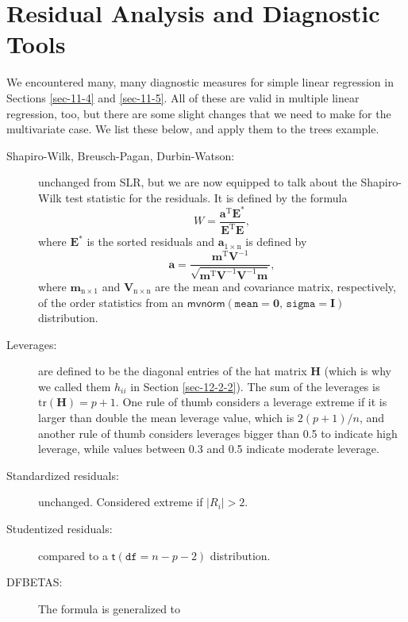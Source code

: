 \section{Residual Analysis and Diagnostic Tools}
\label{sec-12-6}

We encountered many, many diagnostic measures for simple linear
regression in Sections \ref{sec-11-4} and \ref{sec-11-5}. All of these are valid in multiple linear regression, too, but
there are some slight changes that we need to make for the
multivariate case. We list these below, and apply them to the trees
example.

\begin{description}
\item[{Shapiro-Wilk, Breusch-Pagan, Durbin-Watson:}] unchanged from SLR,
but we are now equipped to talk about the Shapiro-Wilk test
statistic for the residuals. It is defined by the formula
\begin{equation}
W=\frac{\mathbf{a}^{\mathrm{T}}\mathbf{E}^{\ast}}{\mathbf{E}^{\mathrm{T}}\mathbf{E}},
\end{equation}
where \(\mathbf{E}^{\ast}\) is the sorted residuals and
\(\mathbf{a}_{1\times\mathrm{n}}\) is defined by
\begin{equation}
\mathbf{a}=\frac{\mathbf{m}^{\mathrm{T}}\mathbf{V}^{-1}}{\sqrt{\mathbf{m}^{\mathrm{T}}\mathbf{V}^{-1}\mathbf{V}^{-1}\mathbf{m}}},
\end{equation}
where \(\mathbf{m}_{\mathrm{n}\times1}\) and
\(\mathbf{V}_{\mathrm{n}\times\mathrm{n}}\) are the mean and
covariance matrix, respectively, of the order statistics from an
\(\mathsf{mvnorm}\left(\mathtt{mean}=\mathbf{0},\,\mathtt{sigma}=\mathbf{I}\right)\)
distribution.
\item[{Leverages:}] are defined to be the diagonal entries of the hat
matrix \(\mathbf{H}\) (which is why we called them
\(h_{ii}\) in Section
\ref{sec-12-2-2}). The sum of the
leverages is \(\mbox{tr}(\mathbf{H})=p+1\). One rule
of thumb considers a leverage extreme if it is larger
than double the mean leverage value, which is
\(2(p+1)/n\), and another rule of thumb considers
leverages bigger than 0.5 to indicate high leverage,
while values between 0.3 and 0.5 indicate moderate
leverage.
\item[{Standardized residuals:}] unchanged. Considered extreme if
\(|R_{i}|>2\).
\item[{Studentized residuals:}] compared to a
\(\mathsf{t}(\mathtt{df}=n-p-2)\) distribution.
\item[{DFBETAS:}] The formula is generalized to

\end{description}
